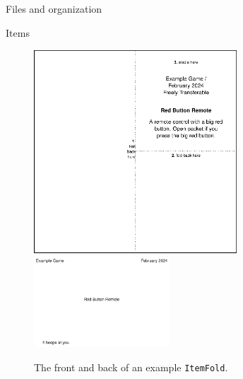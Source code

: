\documentclass[sheet]{GameTexBase}
\begin{document}
\begin{section}{Files and organization}
\begin{subsection}{Items}
\begin{figure}
\centering
\includegraphics[width=3in]{item-fold-front} \includegraphics[width=2in]{item-fold-back}
\caption{The front and back of an example \lstinline|ItemFold|.}
\end{figure}


\end{subsection}
\end{section}
\end{document}
